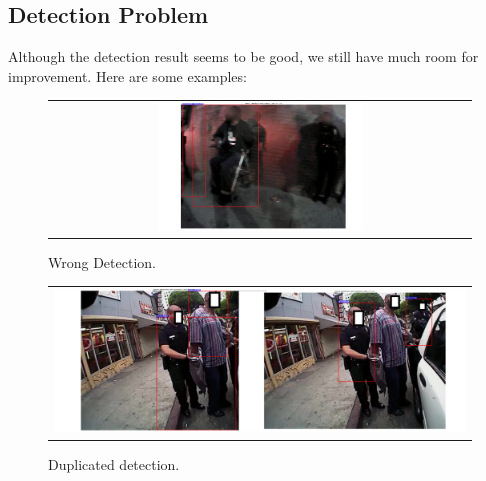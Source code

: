 \documentclass[a4paper]{article}
\begin{document}
\subsection{Detection Problem}
Although the detection result seems to be good, we still have much room for improvement. Here are some examples:\\
\begin{figure}[!ht]
\begin{center}
\begin{tabular}{c}
\includegraphics[width=0.5\textwidth]{Wrong_Detection_censored_two.jpg}\\
\end{tabular}
\end{center}
\caption{Wrong Detection.}
\label{lowresolution}
\end{figure}

\begin{figure}[H]
\begin{center}
\begin{tabular}{c}
\includegraphics[width=1.1\textwidth]{Duplicate_Detection.png}\\
\end{tabular}
\end{center}
\caption{Duplicated detection.}
\label{duplicates}
\end{figure}
\end{document}
